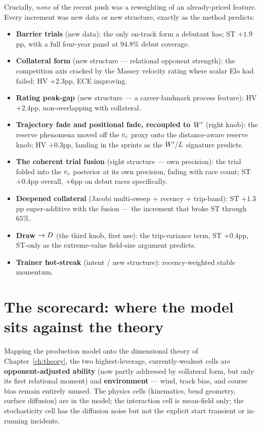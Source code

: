 Crucially, \emph{none} of the recent push was a reweighting of an already-priced feature. Every
increment was new data or new structure, exactly as the method predicts:
\begin{itemize}
  \item \textbf{Barrier trials} (new data): the only on-track form a debutant has; ST $+1.9$pp, with
        a full four-year panel at $94.8\%$ debut coverage.
  \item \textbf{Collateral form} (new structure --- relational opponent strength): the competition
        axis cracked by the Massey velocity rating where scalar Elo had failed; HV $+2.3$pp, ECE
        improving.
  \item \textbf{Rating peak-gap} (new structure --- a career-landmark process feature): HV $+2.4$pp,
        non-overlapping with collateral.
  \item \textbf{Trajectory fade and positional fade, recoupled to ${W^{\prime}}$} (right knob): the
        reserve phenomena moved off the ${v_{c}}$ proxy onto the distance-aware reserve knob; HV
        $+0.3$pp, landing in the sprints as the ${W^{\prime}}/L$ signature predicts.
  \item \textbf{The coherent trial fusion} (right structure --- own precision): the trial folded into
        the ${v_{c}}$ posterior at its own precision, fading with race count; ST $+0.4$pp overall,
        $+6$pp on debut races specifically.
  \item \textbf{Deepened collateral} (Jacobi multi-sweep + recency + trip-band): ST $+1.3$pp
        super-additive with the fusion --- the increment that broke ST through $65\%$.
  \item \textbf{Draw $\to D$} (the third knob, first use): the trip-variance term, ST $+0.4$pp,
        ST-only as the extreme-value field-size argument predicts.
  \item \textbf{Trainer hot-streak} (intent / new structure): recency-weighted stable momentum.
\end{itemize}

\section{The scorecard: where the model sits against the theory}

Mapping the production model onto the dimensional theory of Chapter~\ref{ch:theory}, the two
highest-leverage, currently-weakest cells are \textbf{opponent-adjusted ability} (now partly
addressed by collateral form, but only its first relational moment) and \textbf{environment} ---
wind, track bias, and course bias remain entirely unused. The physics cells (kinematics, bend
geometry, surface diffusion) are in the model; the interaction cell is mean-field only; the
stochasticity cell has the diffusion noise but not the explicit start transient or in-running
incidents.

